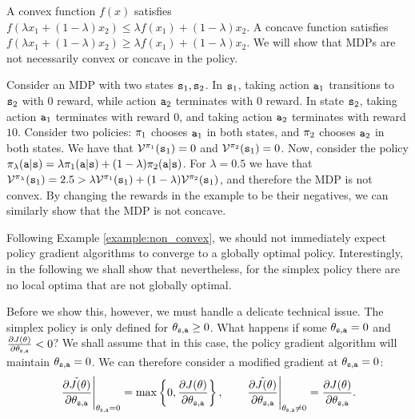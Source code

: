 \begin{example}\label{example:non_convex}
    A convex function $f(x)$ satisfies $f(\lambda x_1 + (1-\lambda) x_2) \leq \lambda f(x_1) + (1-\lambda) x_2$. A concave function satisfies $f(\lambda x_1 + (1-\lambda) x_2) \geq \lambda f(x_1) + (1-\lambda) x_2$.
    We will show that MDPs are not necessarily convex or concave in the policy.

    Consider an MDP with two states ${\tt s}_1, {\tt s}_2$. In ${\tt s}_1$, taking action ${\tt a}_1$ transitions to ${\tt s}_2$ with 0 reward, while action ${\tt a}_2$ terminates with 0 reward. In state ${\tt s}_2$, taking action ${\tt a}_1$ terminates with reward $0$, and taking action ${\tt a}_2$ terminates with reward $10$. Consider two policies: $\pi_1$ chooses ${\tt a}_1$ in both states, and $\pi_2$ chooses ${\tt a}_2$ in both states. We have that $\mathcal{V}^{\pi_1}({\tt s}_1) = 0$ and $\mathcal{V}^{\pi_2}({\tt s}_1) = 0$. 
    Now, consider the policy $\pi_\lambda({\tt a}|{\tt s}) = \lambda \pi_1({\tt a}|{\tt s}) + (1-\lambda)\pi_2({\tt a}|{\tt s})$. For $\lambda=0.5$ we have that $\mathcal{V}^{\pi_\lambda}({\tt s}_1) = 2.5 > \lambda \mathcal{V}^{\pi_1}({\tt s}_1) + (1-\lambda) \mathcal{V}^{\pi_2}({\tt s}_1)$, and therefore the MDP is not convex. 
    By changing the rewards in the example to be their negatives, we can similarly show that the MDP is not concave.
\end{example}

Following Example \ref{example:non_convex}, we should not immediately expect policy gradient algorithms to converge to a globally optimal policy. Interestingly, in the following we shall show that nevertheless, for the simplex policy there are no local optima that are not globally optimal.

Before we show this, however, we must handle a delicate technical issue. The simplex policy is only defined for $\theta_{{\tt s},{\tt a}}\geq 0$. What happens if some $\theta_{{\tt s},{\tt a}} = 0$ and $\frac{\partial J(\theta)}{\partial \theta_{{\tt s},{\tt a}}} < 0$? We shall assume that in this case, the policy gradient algorithm will maintain $\theta_{{\tt s},{\tt a}} = 0$. We can therefore consider a modified gradient at $\theta_{{\tt s},{\tt a}} = 0$:
\begin{equation*}
    \left.\tilde{\frac{\partial J(\theta)}{\partial \theta_{{\tt s},{\tt a}}}}\right|_{\theta_{{\tt s},{\tt a}} = 0} = \max \left\{0, \frac{\partial J(\theta)}{\partial \theta_{{\tt s},{\tt a}}}\right\}, \qquad \left.\tilde{\frac{\partial J(\theta)}{\partial \theta_{{\tt s},{\tt a}}}}\right|_{\theta_{{\tt s},{\tt a}} \neq 0} = \frac{\partial J(\theta)}{\partial \theta_{{\tt s},{\tt a}}}.
\end{equation*}


